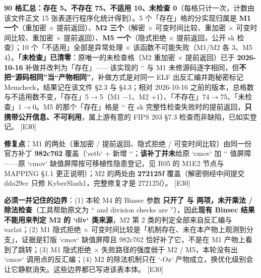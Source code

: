 \documentclass[UTF8,fontset=fandol,11pt,a4paper]{ctexart}
\begin{document}
\textbf{90 格汇总：存在 5、不存在 75、不适用 10、未检查 0}（每格只计一次，计数由该文件正文 15 张表逐行程序化统计得到）。5 个「存在」格的分实现归属是 \textbf{M1 一个}（重加密 \texorpdfstring{$\times$}{x} 提前返回）、\textbf{M2 三个}（解密 \texorpdfstring{$\times$}{x} 可变时间比较、重加密 \texorpdfstring{$\times$}{x} 可变时间比较、重加密 \texorpdfstring{$\times$}{x} 提前返回）、\textbf{M5 一个}（隐式拒绝 \texorpdfstring{$\times$}{x} 提前返回，公开 sk 检查）；10 个「不适用」全部是异常处理 \texorpdfstring{$\times$}{x} 该函数不可能失败（M1/M2 各 3、M5 4）。\textbf{「未检查」已清零}：原唯一的未检查格（M2 重加密 \texorpdfstring{$\times$}{x} 提前返回）已于 \textbf{2026-10-16} 补做并改判为「存在」——该实现的 `\texttt{}` 与 M1 未修源码逐字相同，但\textbf{不把“源码相同”当“产物相同”}，补做方式是对同一 ELF 出反汇编并跑秘密标记 Memcheck，结果记在该文件 §2.3 与 §4.3；相对 2026-10-16 之前的版本，总格数与不适用数不变，「存在」5\texorpdfstring{$\rightarrow$}{->}5（M1 \texorpdfstring{$-$}{-}1、M2 +1）、「不存在」74\texorpdfstring{$\rightarrow$}{->}75、「未检查」1\texorpdfstring{$\rightarrow$}{->}0。M5 的那个「存在」格是 `\texttt{}` 在 sk 完整性检查失败时的提前返回，\textbf{只携带公开信息、不可利用}，属上游有意的 FIPS 203 §7.3 检查而非缺陷，已如实登记。 [E30]


\textbf{修复点}：M1 的两处（重加密 / 提前返回、隐式拒绝 / 可变时间比较）由同一份官方补丁 \textbf{982c762} 覆盖（`setb` + 新增 `\texttt{}`；\textbf{该补丁并未}给原 `cmov` 加 `\texttt{\seqsplit{\_}}\texttt{}\texttt{\seqsplit{\_}}\texttt{\seqsplit{\_}}` 值屏障——原 `cmov` 缺值屏障按可移植性隐患登记，见 R05 的 M1E2 节点与 MAPPING §1.1 更正说明）；M2 的两处由 \textbf{272125f} 覆盖（解密侧经中间提交 dda29cc 只修 KyberSlash1，完整修复才是 272125f）。 [E30]


\textbf{必须一并记住的边界}：(1) 本轮 M4 的 Binsec 参数 \texttt{} \textbf{只开了 \texttt{} 与 \texttt{} 两项，未开乘法 / 除法检查}（工具帮助原文为 “\texttt{} and division checks are \texttt{}”），因此\textbf{现有 Binsec 结果不能用来判定 M2 的 `div` 类来源}，M2 第 2 类的判定全部来自反汇编与 varlat；(2) M1 隐式拒绝 \texorpdfstring{$\times$}{x} 可变时间比较是「机制存在、未在本产物上观测到分支」，证据是钉版 `cmov` 缺值屏障且 982c762 恰好补了它，不是在 M1 产物上看到了跳转；(3) M1 隐式拒绝 \texorpdfstring{$\times$}{x} 失败路径的强度弱于 M2 / M5，本轮没有出 `cmov` 调用点的反汇编；(4) M2 的除法机制只在 `-Oz` 产物成立，换优化级别会让它静默消失。这些边界都已写进该表本体。 [E30]
\end{document}
